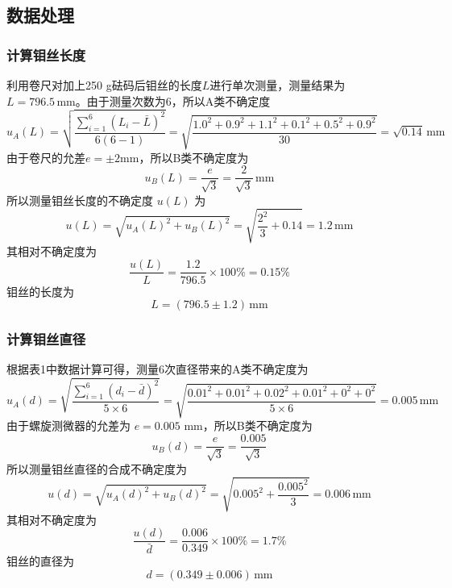 \documentclass[zihao=5, UTF8]{article}
\theoremstyle{MyLineTheoremStyle} %
\theoremstyle{MyBlockTheoremStyle} %
\theoremstyle{MySubsubsectionStyle} %
\begin{document}
\subsection{数据处理}
\subsubsection{计算钼丝长度}
利用卷尺对加上250 g砝码后钼丝的长度$L$进行单次测量，测量结果为$L = 796.5 \, \text{mm}$。由于测量次数为6，所以A类不确定度
\[
u_A (L) = \sqrt{\frac{\sum_{i=1}^{6} (L_i - \bar{L})^2}{6(6-1)}} = \sqrt{\frac{1.0^2 + 0.9^2 + 1.1^2 + 0.1^2 + 0.5^2 + 0.9^2}{30}} = \sqrt{0.14} \, \text{mm}
\]
由于卷尺的允差$e = \pm2$mm，所以B类不确定度为
\[
u_B (L) = \frac{e}{\sqrt{3}} = \frac{2}{\sqrt{3}} \, \text{mm}
\]
所以测量钼丝长度的不确定度 $u(L)$ 为
\[
u(L) = \sqrt{u_A (L)^2 + u_B (L)^2} = \sqrt{\frac{2^2}{3} + 0.14} = 1.2 \, \text{mm}
\]
其相对不确定度为
\[
\frac{u(L)}{L} = \frac{1.2}{796.5} \times 100\% = 0.15\%
\]
钼丝的长度为
\[
L = (796.5 \pm 1.2) \, \text{mm}
\]

\subsubsection{计算钼丝直径}
根据表1中数据计算可得，测量6次直径带来的A类不确定度为
\[
u_A (d) = \sqrt{\frac{\sum_{i=1}^{6} (d_i - \bar{d})^2}{5 \times 6}} = \sqrt{\frac{0.01^2 + 0.01^2 + 0.02^2 + 0.01^2 + 0^2 + 0^2}{5 \times 6}} = 0.005 \, \text{mm}
\]
由于螺旋测微器的允差为 $e = 0.005$ mm，所以B类不确定度为
\[
u_B (d) = \frac{e}{\sqrt{3}} = \frac{0.005}{\sqrt{3}}
\]
所以测量钼丝直径的合成不确定度为
\[
u(d) = \sqrt{u_A (d)^2 + u_B (d)^2} = \sqrt{0.005^2 + \frac{0.005^2}{3}} = 0.006 \, \text{mm}
\]
其相对不确定度为
\[
\frac{u(d)}{\bar{d}} = \frac{0.006}{0.349} \times 100\% = 1.7\%
\]
钼丝的直径为
\[
d = (0.349 \pm 0.006) \, \text{mm}
\]
\end{document}
